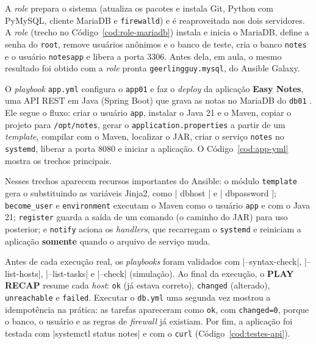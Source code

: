 
A \textit{role}  prepara o sistema (atualiza os pacotes e instala Git,
Python com PyMySQL, cliente MariaDB e \texttt{firewalld}) e é reaproveitada nos dois servidores. A
\textit{role}  (trecho no Código~\ref{cod:role-mariadb}) instala e inicia o
MariaDB, define a senha do \texttt{root}, remove usuários anônimos e o banco de teste, cria o banco
\texttt{notes} e o usuário \texttt{notesapp} e libera a porta 3306. Antes dela, em aula, o mesmo
resultado foi obtido com a \textit{role} pronta \texttt{geerlingguy.mysql}, do Ansible Galaxy.


O \textit{playbook} \texttt{app.yml} configura o \texttt{app01} e faz o \textit{deploy} da aplicação
\textbf{Easy Notes}, uma API REST em Java (Spring Boot) que grava as notas no MariaDB do
\texttt{db01} \citep{singh2021}. Ele segue o fluxo: criar o usuário \texttt{app}, instalar o Java 21 e
o Maven, copiar o projeto para \texttt{/opt/notes}, gerar o \texttt{application.properties} a partir
de um \textit{template}, compilar com o Maven, localizar o JAR, criar o serviço \texttt{notes} no
\texttt{systemd}, liberar a porta 8080 e iniciar a aplicação. O Código~\ref{cod:app-yml} mostra os
trechos principais.


Nesses trechos aparecem recursos importantes do Ansible: o módulo \texttt{template} gera o
 substituindo as variáveis Jinja2, como \cod|{{ dbhost }}| e
\cod|{{ dbpassword }}|; \texttt{become\_user} e \texttt{environment} executam o Maven como
o usuário \texttt{app} e com o Java 21; \texttt{register} guarda a saída de um comando (o caminho do
JAR) para uso posterior; e \texttt{notify} aciona os \textit{handlers}, que recarregam o
\texttt{systemd} e reiniciam a aplicação \textbf{somente} quando o arquivo de serviço muda.

Antes de cada execução real, os \textit{playbooks} foram validados com \cod|--syntax-check|,
\cod|--list-hosts|, \cod|--list-tasks| e \cod|--check| (simulação). Ao final da execução, o
\textbf{PLAY RECAP} resume cada \textit{host}: \texttt{ok} (já estava correto), \texttt{changed}
(alterado), \texttt{unreachable} e \texttt{failed}. Executar o \texttt{db.yml} uma segunda vez mostrou
a idempotência na prática: as tarefas apareceram como \texttt{ok}, com \texttt{changed=0}, porque o
banco, o usuário e as regras de \textit{firewall} já existiam. Por fim, a aplicação foi testada com
\cod|systemctl status notes| e com o \texttt{curl} (Código~\ref{cod:testes-api}).


